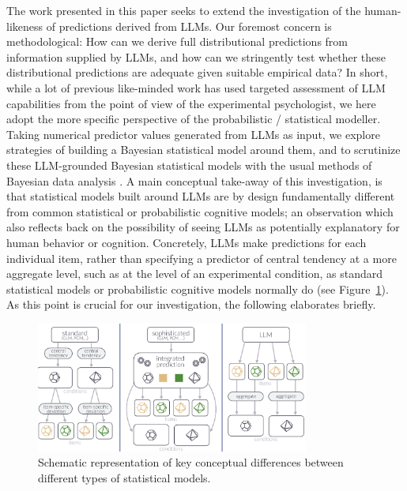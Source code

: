 \documentclass[fleqn]{article}
\begin{document}
The work presented in this paper seeks to extend the investigation of the human-likeness of predictions derived from LLMs.
Our foremost concern is methodological: How can we derive full distributional predictions from information supplied by LLMs, and how can we stringently test whether these distributional predictions are adequate given suitable empirical data?
In short, while a lot of previous like-minded work has used targeted assessment of LLM capabilities from the point of view of the experimental psychologist, we here adopt the more specific perspective of the probabilistic / statistical modeller.
Taking numerical predictor values generated from LLMs as input, we explore strategies of building a Bayesian statistical model around them, and to scrutinize these LLM-grounded Bayesian statistical models with the usual methods of Bayesian data analysis \citep{GelmanCarlin2014:Bayesian-Data-A}.
A main conceptual take-away of this investigation, is that statistical models built around LLMs are by design fundamentally different from common statistical or probabilistic cognitive models; an observation which also reflects back on the possibility of seeing LLMs as potentially explanatory for human behavior or cognition.
Concretely, LLMs make predictions for each individual item, rather than specifying a predictor of central tendency at a more aggregate level, such as at the level of an experimental condition, as standard statistical models or probabilistic cognitive models normally do (see Figure~\ref{fig:stats-model-types}).
As this point is crucial for our investigation, the following elaborates briefly.

\begin{figure}[t]
  \centering
  \includegraphics[width = 0.8\textwidth]{00-pics/condition-item-level-prediction.png}
  \caption{Schematic representation of key conceptual differences between different types of statistical models.}
  \label{fig:stats-model-types}
\end{figure}
\end{document}
